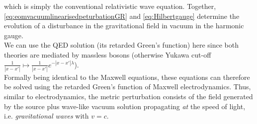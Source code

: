 which is simply the conventional relativistic wave equation. Together, \ref{eq:eomvacuumlinearisedpeturbationGR} and \ref{eq:Hilbertgauge}
determine the evolution of a disturbance in the gravitational field in vacuum in the harmonic
gauge.\\
We can use the QED solution (its retarded Green's function) here since both theories are mediated by massless bosons (otherwise Yukawa cut-off $\frac{1}{|x-x'|} \mapsto \frac{1}{|x-x'|} e^{- |x-x'|\lambda}$). \\
Formally being identical to the Maxwell equations, these equations can therefore be solved using the retarded Green's function of Maxwell electrodynamics. Thus, similar to electrodynamics, the metric perturbation consists of the field generated by the source plus wave-like vacuum solution propagating \emph{at} the speed of light, i.e. \emph{gravitational waves} with $v=c$.


